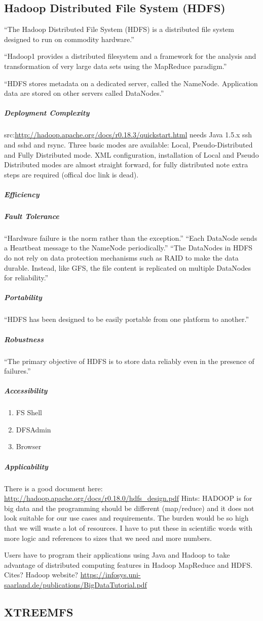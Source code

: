 \subsection{Hadoop Distributed File System (HDFS)}
``The Hadoop Distributed File System (HDFS) is a distributed file system designed to run on
commodity hardware.'' \cite[tp.~3]{HDFSDocuments}

``Hadoop1 provides a distributed filesystem and a framework 
for the analysis and transformation of very large data sets 
using the MapReduce \cite{DG04} paradigm.''\cite{TheHDFS}

``HDFS stores metadata on a
dedicated server, called the NameNode. Application data are stored on
other servers called DataNodes.''\cite{TheHDFS}


\subparagraph{Deployment Complexity}
src:\url{http://hadoop.apache.org/docs/r0.18.3/quickstart.html}
needs Java 1.5.x ssh and sshd and rsync. Three basic modes are available:
Local, Pseudo-Distributed and Fully Distributed mode. XML configuration,
installation of Local and Pseudo Distributed modes are almost straight
forward, for fully distributed note extra steps are required (offical
doc link is dead).
\subparagraph{Efficiency}


\subparagraph{Fault Tolerance}
``Hardware failure is the norm rather than the exception.''
``Each DataNode sends a Heartbeat message to the NameNode periodically.''
``The DataNodes in HDFS do not rely on data protection mechanisms 
such as RAID to make the data durable. Instead, like GFS, 
the file content is replicated on multiple DataNodes for reliability.''
\cite{TheHDFS}
\subparagraph{Portability}


``HDFS has been designed to be easily portable from one platform to another.''
\subparagraph{Robustness}

``The primary objective of HDFS is to store data reliably even in the presence of failures.''
\subparagraph{Accessibility}
\begin{enumerate}
\item FS Shell
\item DFSAdmin
\item Browser
\end{enumerate}

\subparagraph{Applicability}
There is a good document here:
\url{http://hadoop.apache.org/docs/r0.18.0/hdfs_design.pdf}
Hints: HADOOP is for big data and the programming should be different (map/reduce)
 and it does not look suitable for our use cases and requirements. The burden would
 be so high that we will waste a lot of resources. I have to put these in scientific
 words with more logic and references to sizes that we need and more numbers.

Users have to program their applications using Java and Hadoop to 
take advantage of distributed computing features in Hadoop MapReduce
and HDFS. Cites? Hadoop website?
\url{https://infosys.uni-saarland.de/publications/BigDataTutorial.pdf}

\subsection{XTREEMFS}
